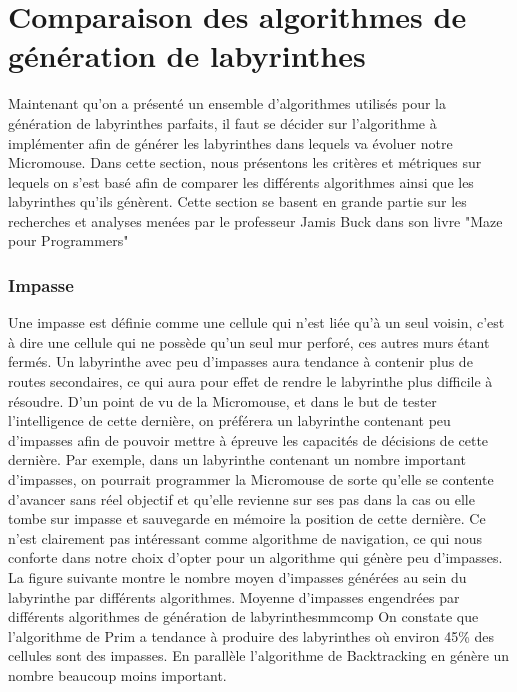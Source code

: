 \newpage
\section{Comparaison des algorithmes de génération de labyrinthes}

Maintenant qu'on a présenté un ensemble d'algorithmes utilisés pour la génération de labyrinthes parfaits, il faut se décider sur l'algorithme à implémenter afin de générer les labyrinthes dans lequels va évoluer notre Micromouse. Dans cette section, nous présentons les critères et métriques sur lequels on s'est basé afin de comparer les différents algorithmes ainsi que les labyrinthes qu'ils génèrent. Cette section se basent en grande partie sur les recherches et analyses menées par le professeur Jamis Buck dans son livre "Maze pour Programmers"\cite{maze_for_programmers}

\subsubsection{Impasse}
Une impasse est définie comme une cellule qui n'est liée qu'à un seul voisin, c'est à dire une cellule qui ne possède qu'un seul mur perforé, ces autres murs étant fermés.
Un labyrinthe avec peu d'impasses aura tendance à contenir plus de routes secondaires, ce qui aura pour effet de rendre le labyrinthe plus difficile à résoudre. 
D'un point de vu de la Micromouse, et dans le but de tester l'intelligence de cette dernière, on préférera un labyrinthe contenant peu d'impasses afin de pouvoir mettre à épreuve les capacités de décisions de cette dernière. Par exemple, dans un labyrinthe contenant un nombre important d'impasses, on pourrait programmer la Micromouse de sorte qu'elle se contente d'avancer sans réel objectif et qu'elle revienne sur ses pas dans la cas ou elle tombe sur impasse et sauvegarde en mémoire la position de cette dernière. 
Ce n'est clairement pas intéressant comme algorithme de navigation, ce qui nous conforte dans notre choix d'opter pour un algorithme qui génère peu d'impasses.
\newline
La figure suivante montre le nombre moyen d'impasses générées au sein du labyrinthe par différents algorithmes.
\newline
{}
{Moyenne d'impasses engendrées par différents algorithmes de génération de labyrinthes}{mmcomp}
\newline
On constate que l'algorithme de Prim a tendance à produire des labyrinthes où environ 45\% des cellules sont des impasses. En parallèle l'algorithme de Backtracking en génère un nombre beaucoup moins important.


